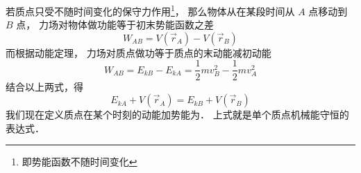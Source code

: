 

若质点只受不随时间变化的保守力作用\footnote{即势能函数不随时间变化}， 那么物体从在某段时间从 $A$ 点移动到 $B$ 点， 力场对物体做功能等于初末势能函数之差
\begin{equation}
W_{AB} = V(\vec r_A) - V(\vec r_B)
\end{equation}
而根据动能定理， 力场对质点做功等于质点的末动能减初动能
\begin{equation}
W_{AB} = E_{kB} - E_{kA} = \frac12 m v_B^2 - \frac12 m v_A^2
\end{equation}
结合以上两式，得
\begin{equation}
E_{kA} + V(\vec r_A) = E_{kB} + V(\vec r_B)
\end{equation}
我们现在定义质点在某个时刻的动能加势能为． 上式就是单个质点机械能守恒的表达式．